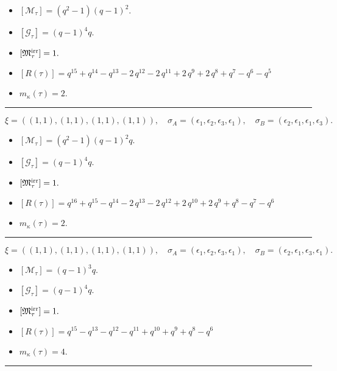 \documentclass[10pt,a4paper]{amsart}
\begin{document}
\begin{itemize}
 \item $[\mathcal{M}_{\tau}] = {\left(q^{2} - 1\right)} {\left(q - 1\right)}^{2} .$

 \item $[\mathcal{G}_{\tau}] = {\left(q - 1\right)}^{4} q .$

 \item $[{\frak M}_{\tau}^{\textrm{irr}}] = 1 .$

 \item $[R(\tau)] = q^{15} + q^{14} - q^{13} - 2 \, q^{12} - 2 \, q^{11} + 2 \, q^{9} + 2 \, q^{8} + q^{7} - q^{6} - q^{5} $

 \item $m_{\kappa}(\tau) = 2 .$

 \end{itemize}
\noindent\rule{8cm}{0.4pt}

$$\xi = ({(1, 1)}, {(1, 1), (1, 1)}, {(1, 1)}),\quad \sigma_A = ({{\epsilon_1}}, {{\epsilon_2}, {\epsilon_3}}, {{\epsilon_1}}),\quad \sigma_B = ({{\epsilon_2}}, {{\epsilon_1}, {\epsilon_1}}, {{\epsilon_3}}).$$

\begin{itemize}
 \item $[\mathcal{M}_{\tau}] = {\left(q^{2} - 1\right)} {\left(q - 1\right)}^{2} q .$

 \item $[\mathcal{G}_{\tau}] = {\left(q - 1\right)}^{4} q .$

 \item $[{\frak M}_{\tau}^{\textrm{irr}}] = 1 .$

 \item $[R(\tau)] = q^{16} + q^{15} - q^{14} - 2 \, q^{13} - 2 \, q^{12} + 2 \, q^{10} + 2 \, q^{9} + q^{8} - q^{7} - q^{6} $

 \item $m_{\kappa}(\tau) = 2 .$

 \end{itemize}
\noindent\rule{8cm}{0.4pt}

$$\xi = ({(1, 1)}, {(1, 1), (1, 1)}, {(1, 1)}),\quad \sigma_A = ({{\epsilon_1}}, {{\epsilon_2}, {\epsilon_3}}, {{\epsilon_1}}),\quad \sigma_B = ({{\epsilon_2}}, {{\epsilon_1}, {\epsilon_3}}, {{\epsilon_1}}).$$

\begin{itemize}
 \item $[\mathcal{M}_{\tau}] = {\left(q - 1\right)}^{3} q .$

 \item $[\mathcal{G}_{\tau}] = {\left(q - 1\right)}^{4} q .$

 \item $[{\frak M}_{\tau}^{\textrm{irr}}] = 1 .$

 \item $[R(\tau)] = q^{15} - q^{13} - q^{12} - q^{11} + q^{10} + q^{9} + q^{8} - q^{6} $

 \item $m_{\kappa}(\tau) = 4 .$

 \end{itemize}
\noindent\rule{8cm}{0.4pt}
\end{document}
